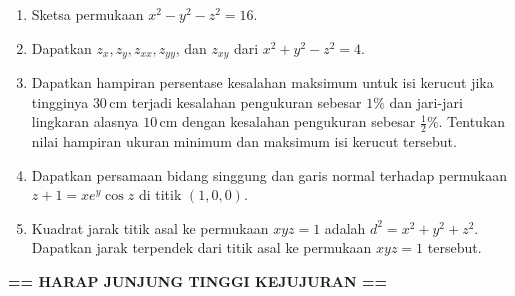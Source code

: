 \documentclass[11pt,a4paper]{article}
\begin{document}
\begin{enumerate}
  \item Sketsa permukaan
        $
          x^2 - y^2 - z^2 = 16.
        $

  \item Dapatkan $z_x, z_y, z_{xx}, z_{yy}$, dan $z_{xy}$ dari
        $
          x^2 + y^2 - z^2 = 4.
        $

  \item Dapatkan hampiran persentase kesalahan maksimum untuk isi kerucut jika tingginya $30\,\text{cm}$ terjadi kesalahan pengukuran sebesar $1\%$ dan jari-jari lingkaran alasnya $10\,\text{cm}$ dengan kesalahan pengukuran sebesar $\tfrac{1}{2}\%$. Tentukan nilai hampiran ukuran minimum dan maksimum isi kerucut tersebut.

  \item Dapatkan persamaan bidang singgung dan garis normal terhadap permukaan
        $
          z + 1 = x e^{y} \cos z
        $
        di titik $(1, 0, 0)$.

  \item Kuadrat jarak titik asal ke permukaan $xyz = 1$ adalah
        $
          d^2 = x^2 + y^2 + z^2.
        $
        Dapatkan jarak terpendek dari titik asal ke permukaan $xyz = 1$ tersebut.
\end{enumerate}
\begin{center}
  \textbf{== HARAP JUNJUNG TINGGI KEJUJURAN ==}
\end{center}
\end{document}
